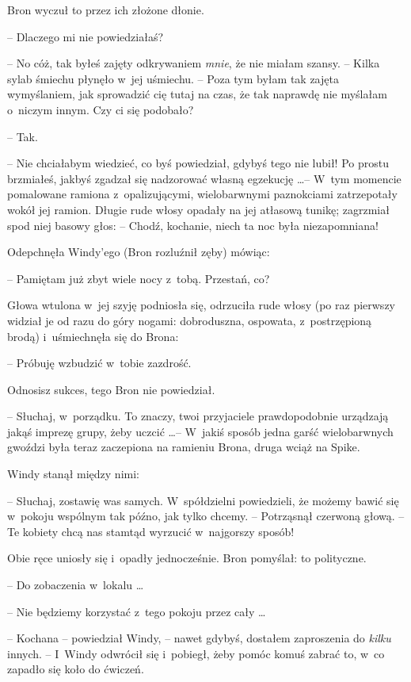 \documentclass[oneside,polish,11pt,rmheadings]{mwbk}
\begin{document}
Bron wyczuł to przez ich złożone dłonie. 

-- Dlaczego mi nie powiedziałaś? 

-- No cóż, tak byłeś zajęty odkrywaniem \textit{mnie}, że nie miałam szansy. -- Kilka sylab śmiechu płynęło w~jej uśmiechu. -- Poza tym byłam tak zajęta wymyślaniem, jak sprowadzić cię tutaj na czas, że tak naprawdę nie myślałam o~niczym innym. Czy ci się podobało? 

-- Tak. 

-- Nie chciałabym wiedzieć, co byś powiedział, gdybyś tego nie lubił! Po prostu brzmiałeś, jakbyś zgadzał się nadzorować własną egzekucję \ldots  -- W~tym momencie pomalowane ramiona z~opalizującymi, wielobarwnymi paznokciami zatrzepotały wokół jej ramion. Długie rude włosy opadały na jej atłasową tunikę; zagrzmiał spod niej basowy głos: -- Chodź, kochanie, niech ta noc była niezapomniana! 

Odepchnęła Windy'ego (Bron rozluźnił zęby) mówiąc: 

-- Pamiętam już zbyt wiele nocy z~tobą. Przestań, co? 

Głowa wtulona w~jej szyję podniosła się, odrzuciła rude włosy (po raz pierwszy widział je od razu do góry nogami: dobroduszna, ospowata, z~postrzępioną brodą) i~uśmiechnęła się do Brona: 

-- Próbuję wzbudzić w~tobie zazdrość. 

Odnosisz sukces, tego Bron nie powiedział. 

-- Słuchaj, w~porządku. To znaczy, twoi przyjaciele prawdopodobnie urządzają jakąś imprezę grupy, żeby uczcić \ldots  -- W~jakiś sposób jedna garść wielobarwnych gwoździ była teraz zaczepiona na ramieniu Brona, druga wciąż na Spike. 

Windy stanął między nimi: 

-- Słuchaj, zostawię was samych. W~spółdzielni powiedzieli, że możemy bawić się w~pokoju wspólnym tak późno, jak tylko chcemy. -- Potrząsnął czerwoną głową. -- Te kobiety chcą nas stamtąd wyrzucić w~najgorszy sposób! 

Obie ręce uniosły się i~opadły jednocześnie. Bron pomyślał: to polityczne. 

-- Do zobaczenia w~lokalu \ldots  

-- Nie będziemy korzystać z~tego pokoju przez cały \ldots  

-- Kochana -- powiedział Windy, -- nawet gdybyś, dostałem zaproszenia do \textit{kilku }innych. -- I~Windy odwrócił się i~pobiegł, żeby pomóc komuś zabrać to, w~co zapadło się koło do ćwiczeń. 
\end{document}
